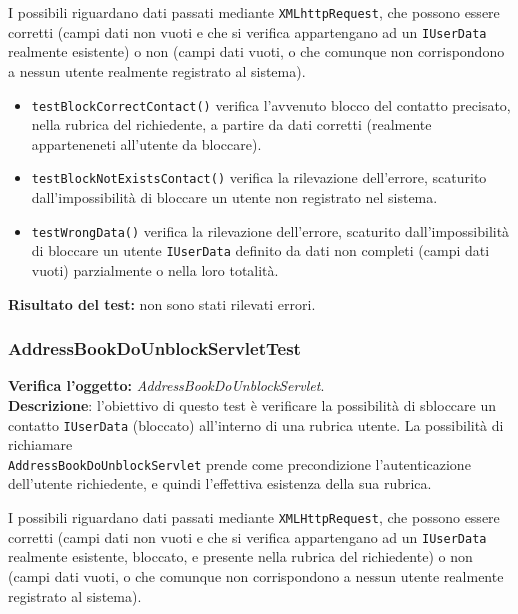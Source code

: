 I possibili  riguardano dati passati mediante \texttt{XMLhttpRequest}, che possono essere corretti (campi dati non vuoti e che si verifica appartengano ad un \texttt{IUserData} realmente esistente) o non (campi dati vuoti, o che comunque non corrispondono a nessun utente realmente registrato al sistema).
\begin{itemize}
\item \texttt{testBlockCorrectContact()} verifica l'avvenuto blocco del contatto precisato, nella rubrica del richiedente, a partire da dati corretti (realmente apparteneneti all'utente da bloccare).
\item \texttt{testBlockNotExistsContact()} verifica la rilevazione dell'errore, scaturito dall'impossibilità di bloccare un utente non registrato nel sistema.
\item \texttt{testWrongData()} verifica la rilevazione dell'errore, scaturito dall'impossibilità di bloccare un utente \texttt{IUserData} definito da dati non completi (campi dati vuoti) parzialmente o nella loro totalità.
\end{itemize}
\textbf{Risultato del test:} non sono stati rilevati errori.

\subsubsection{AddressBookDoUnblockServletTest}
\textbf{Verifica l'oggetto:} \textit{AddressBookDoUnblockServlet}.\\
\textbf{Descrizione}: l'obiettivo di questo test è verificare la possibilità di sbloccare un contatto \texttt{IUserData} (bloccato) all'interno di una rubrica utente. La possibilità di richiamare\\ \texttt{AddressBookDoUnblockServlet} prende come precondizione l'autenticazione dell'utente richiedente, e quindi l'effettiva esistenza della sua rubrica.

I possibili  riguardano dati passati mediante \texttt{XMLHttpRequest}, che possono essere corretti (campi dati non vuoti e che si verifica appartengano ad un \texttt{IUserData} realmente esistente, bloccato, e presente nella rubrica del richiedente) o non (campi dati vuoti, o che comunque non corrispondono a nessun utente realmente registrato al sistema).


